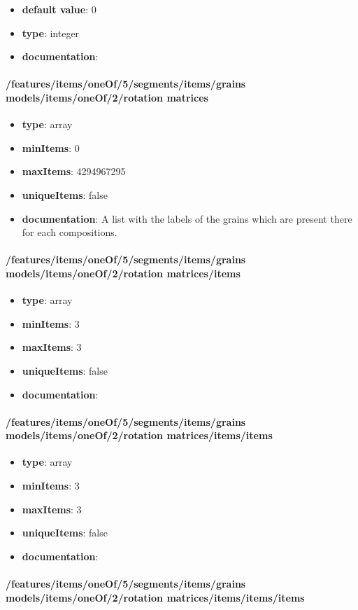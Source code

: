 \begin{itemize}\item {\bf default value}: 0
\item {\bf type}: integer
\item {\bf documentation}: 
\end{itemize}\paragraph{/features/items/oneOf/5/segments/items/grains models/items/oneOf/2/rotation matrices}
\begin{itemize}\item {\bf type}: array
\item {\bf minItems}: 0
\item {\bf maxItems}: 4294967295
\item {\bf uniqueItems}: false
\item {\bf documentation}: A list with the labels of the grains which are present there for each compositions.
\end{itemize}\paragraph{/features/items/oneOf/5/segments/items/grains models/items/oneOf/2/rotation matrices/items}
\begin{itemize}\item {\bf type}: array
\item {\bf minItems}: 3
\item {\bf maxItems}: 3
\item {\bf uniqueItems}: false
\item {\bf documentation}: 
\end{itemize}\paragraph{/features/items/oneOf/5/segments/items/grains models/items/oneOf/2/rotation matrices/items/items}
\begin{itemize}\item {\bf type}: array
\item {\bf minItems}: 3
\item {\bf maxItems}: 3
\item {\bf uniqueItems}: false
\item {\bf documentation}: 
\end{itemize}\paragraph{/features/items/oneOf/5/segments/items/grains models/items/oneOf/2/rotation matrices/items/items/items}
